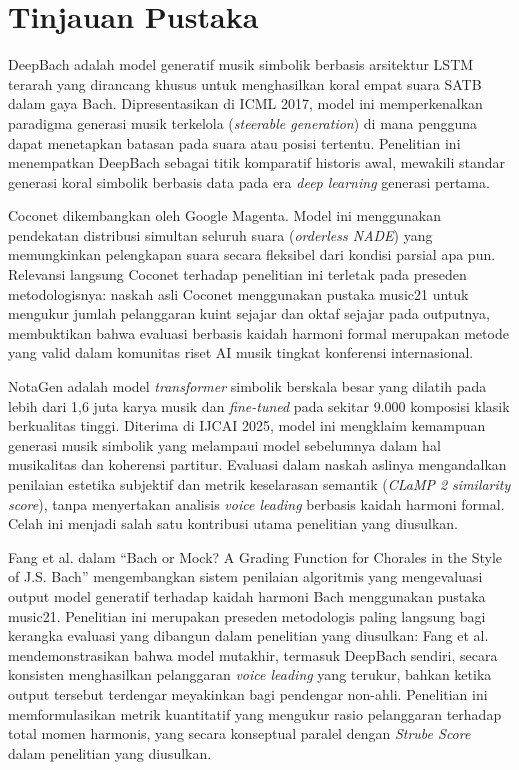 \section{Tinjauan Pustaka}

DeepBach \parencite{hadjeres2017} adalah model generatif musik simbolik berbasis arsitektur LSTM terarah yang dirancang khusus untuk menghasilkan koral empat suara SATB dalam gaya Bach. Dipresentasikan di ICML 2017, model ini memperkenalkan paradigma generasi musik terkelola (\textit{steerable generation}) di mana pengguna dapat menetapkan batasan pada suara atau posisi tertentu. Penelitian ini menempatkan DeepBach sebagai titik komparatif historis awal, mewakili standar generasi koral simbolik berbasis data pada era \textit{deep learning} generasi pertama.

Coconet \parencite{huang2017} dikembangkan oleh Google Magenta. Model ini menggunakan pendekatan distribusi simultan seluruh suara (\textit{orderless NADE}) yang memungkinkan pelengkapan suara secara fleksibel dari kondisi parsial apa pun. Relevansi langsung Coconet terhadap penelitian ini terletak pada preseden metodologisnya: naskah asli Coconet menggunakan pustaka music21 untuk mengukur jumlah pelanggaran kuint sejajar dan oktaf sejajar pada outputnya, membuktikan bahwa evaluasi berbasis kaidah harmoni formal merupakan metode yang valid dalam komunitas riset AI musik tingkat konferensi internasional.

NotaGen \parencite{wang2025} adalah model \textit{transformer} simbolik berskala besar yang dilatih pada lebih dari 1,6 juta karya musik dan \textit{fine-tuned} pada sekitar 9.000 komposisi klasik berkualitas tinggi. Diterima di IJCAI 2025, model ini mengklaim kemampuan generasi musik simbolik yang melampaui model sebelumnya dalam hal musikalitas dan koherensi partitur. Evaluasi dalam naskah aslinya mengandalkan penilaian estetika subjektif dan metrik keselarasan semantik (\textit{CLaMP 2 similarity score}), tanpa menyertakan analisis \textit{voice leading} berbasis kaidah harmoni formal. Celah ini menjadi salah satu kontribusi utama penelitian yang diusulkan.

Fang et al. \parencite{fang2020} dalam ``Bach or Mock? A Grading Function for Chorales in the Style of J.S. Bach'' mengembangkan sistem penilaian algoritmis yang mengevaluasi output model generatif terhadap kaidah harmoni Bach menggunakan pustaka music21. Penelitian ini merupakan preseden metodologis paling langsung bagi kerangka evaluasi yang dibangun dalam penelitian yang diusulkan: Fang et al. mendemonstrasikan bahwa model mutakhir, termasuk DeepBach sendiri, secara konsisten menghasilkan pelanggaran \textit{voice leading} yang terukur, bahkan ketika output tersebut terdengar meyakinkan bagi pendengar non-ahli. Penelitian ini memformulasikan metrik kuantitatif yang mengukur rasio pelanggaran terhadap total momen harmonis, yang secara konseptual paralel dengan \textit{Strube Score} dalam penelitian yang diusulkan.

